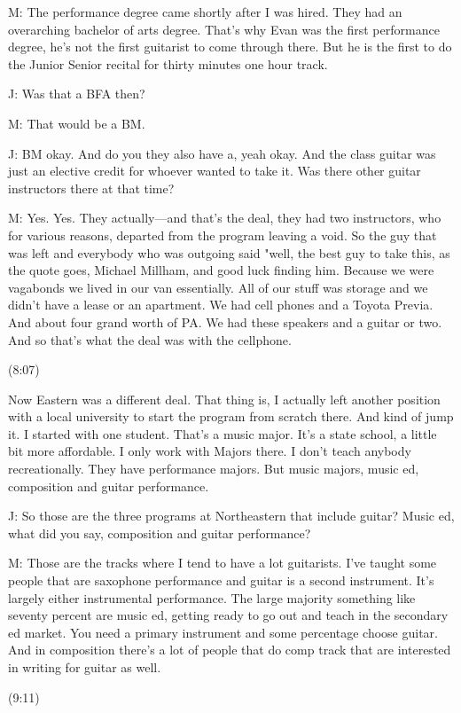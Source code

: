 \documentclass[11pt]{article}
\begin{document}
M: The performance degree came shortly after I was hired. They had an overarching bachelor of arts degree. That's why Evan was the first performance degree, he's not the first guitarist to come through there. But he is the first to do the Junior Senior recital for thirty minutes one hour track. 

J: Was that a BFA then?

M: That would be a BM.

J: BM okay. And do you they also have a, yeah okay. And the class guitar was just an elective credit for whoever wanted to take it. Was there other guitar instructors there at that time? 

M: Yes. Yes. They actually—and that's the deal, they had two instructors, who for various reasons, departed from the program leaving a void. So the guy that was left and everybody who was outgoing said "well, the best guy to take this, as the quote goes, Michael Millham, and good luck finding him. Because we were vagabonds we lived in our van essentially. All of our stuff was storage and we didn't have a lease or an apartment. We had cell phones and a Toyota Previa. And about four grand worth of PA. We had these speakers and a guitar or two. And so that's what the deal was with the cellphone.

(8:07)

Now Eastern was a different deal. That thing is, I actually left another position with a local university to start the program from scratch there. And kind of jump it. I started with one student. That's a music major. It's a state school, a little bit more affordable. I only work with Majors there. I don't teach anybody recreationally. They have performance majors. But music majors, music ed, composition and guitar performance.  

J: So those are the three programs at Northeastern that include guitar? Music ed, what did you say, composition and guitar performance?

M: Those are the tracks where I tend to have a lot guitarists. I've taught some people that are saxophone performance and guitar is a second instrument. It's largely either instrumental performance. The large majority something like seventy percent are music ed, getting ready to go out and teach in the secondary ed market. You need a primary instrument and some percentage choose guitar. And in composition there's a lot of people that do comp track that are interested in writing for guitar as well.

(9:11)
\end{document}
